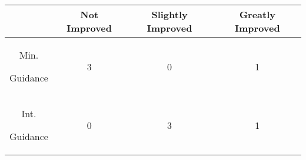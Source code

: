             \begin{table}







            \begin{center}







                \begin{tabular}{|c|c|c|c|}







                    \hline







                        & Not Improved & Slightly Improved & Greatly Improved \\







                    \hline







                    Min. %







Guidance & 3 & 0 & 1\\







                    \hline







                    Int. %







Guidance & 0 & 3 & 1\\







                    \hline








\end{tabular}
\end{center}
\end{table}
